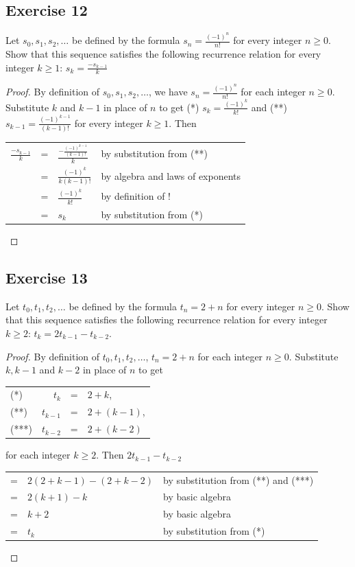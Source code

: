 \documentclass[14pt]{extarticle}
\newcommand{\dps}{\displaystyle}
\newcommand{\cy}{\color{cyan}}
\begin{document}
\subsection{Exercise 12}
Let $s_0, s_1, s_2, \ldots$ be defined by the formula $s_n = \dps \frac{(-1)^n}{n!}$ for every integer $n \geq 0$. 
Show that this sequence satisfies the following recurrence relation for every integer $k \geq 1$: 
\(\dps s_k = \frac{-s_{k - 1}}{k}\)

\begin{proof}
By definition of $s_0, s_1, s_2, \ldots$, we have $s_n = \frac{(-1)^n}{n!}$ for each integer $n \geq 0$. Substitute 
$k$ and $k-1$ in place of $n$ to get (*) $s_k = \frac{(-1)^k}{k!}$ and 
(**) $s_{k-1} = \frac{(-1)^{k-1}}{(k-1)!}$ for every integer $k \geq 1$. Then 

\begin{tabular}{lcll}
$\dps \frac{-s_{k - 1}}{k}$ & = & $\dps \frac{-\frac{(-1)^{k-1}}{(k-1)!}}{k}$ & {\cy by substitution from (**)} \\
& = & $\dps \frac{(-1)^{k}}{k(k-1)!}$ & {\cy by algebra and laws of exponents} \\
& = & $\dps \frac{(-1)^{k}}{k!}$ & {\cy by definition of !} \\
& = & $s_k$ & {\cy by substitution from (*)} \\
\end{tabular}
\end{proof}

\subsection{Exercise 13}
Let $t_0, t_1, t_2, \ldots$ be defined by the formula $t_n = 2 + n$ for every integer $n \geq 0$. Show that this 
sequence satisfies the following recurrence relation for every integer $k \geq 2$: $t_k = 2t_{k - 1} - t_{k - 2}$.

\begin{proof}
By definition of $t_0, t_1, t_2, \ldots$, $t_n = 2+n$ for each integer $n \geq 0$. Substitute $k, k-1$ and $k-2$ in place of $n$ to get

\begin{tabular}{lrcl}
(*) & $t_k$ & = & $2 + k$, \\
(**) & $t_{k - 1}$ & = & $2 + (k - 1)$, \\
(***) & $t_{k - 2}$ & = & $2 + (k - 2)$
\end{tabular} 

for each integer $k \geq 2$. Then $2t_{k - 1} - t_{k - 2}$

\begin{tabular}{lll}
= & $2(2 + k - 1) - (2 + k - 2)$ & {\cy by substitution from (**) and (***)} \\
= & $2(k+1) - k$ & {\cy by basic algebra} \\
= & $k+2$ & {\cy by basic algebra} \\
= & $t_k$ & {\cy by substitution from (*)} \\
\end{tabular}
\end{proof}
\end{document}
